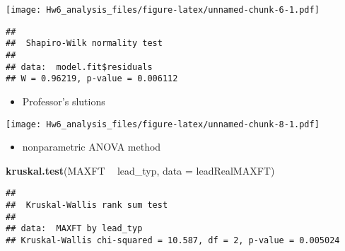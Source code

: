 \documentclass[
]{article}
\newenvironment{Shaded}{\begin{snugshade}}{\end{snugshade}}
\newcommand{\DataTypeTok}[1]{\textcolor[rgb]{0.13,0.29,0.53}{#1}}
\newcommand{\KeywordTok}[1]{\textcolor[rgb]{0.13,0.29,0.53}{\textbf{#1}}}
\newcommand{\NormalTok}[1]{#1}
\newcommand{\OperatorTok}[1]{\textcolor[rgb]{0.81,0.36,0.00}{\textbf{#1}}}
\newcommand{\StringTok}[1]{\textcolor[rgb]{0.31,0.60,0.02}{#1}}
\providecommand{\tightlist}{%
  \setlength{\itemsep}{0pt}\setlength{\parskip}{0pt}}
\begin{document}
\texttt{[image: Hw6\_analysis\_files/figure-latex/unnamed-chunk-6-1.pdf]}

\begin{Shaded}
\end{Shaded}

\begin{verbatim}
## 
##  Shapiro-Wilk normality test
## 
## data:  model.fit$residuals
## W = 0.96219, p-value = 0.006112
\end{verbatim}

\begin{itemize}
\tightlist
\item
  Professor's slutions
\end{itemize}

\begin{Shaded}
\end{Shaded}

\texttt{[image: Hw6\_analysis\_files/figure-latex/unnamed-chunk-8-1.pdf]}

\begin{itemize}
\tightlist
\item
  nonparametric ANOVA method
\end{itemize}

\begin{Shaded}
\begin{Highlighting}[]
\KeywordTok{kruskal.test}\NormalTok{(MAXFT }\OperatorTok{~}\StringTok{ }\NormalTok{lead_typ, }\DataTypeTok{data =}\NormalTok{ leadRealMAXFT)}
\end{Highlighting}
\end{Shaded}

\begin{verbatim}
## 
##  Kruskal-Wallis rank sum test
## 
## data:  MAXFT by lead_typ
## Kruskal-Wallis chi-squared = 10.587, df = 2, p-value = 0.005024
\end{verbatim}
\end{document}
